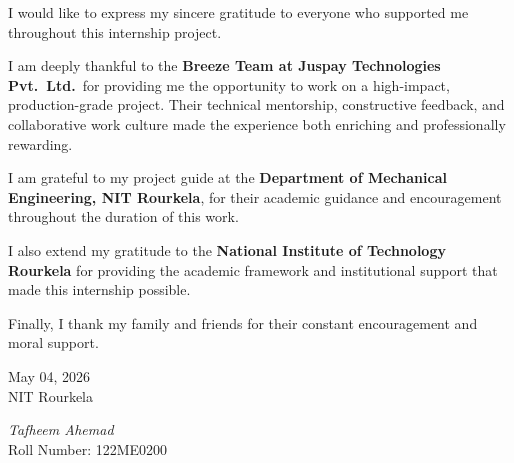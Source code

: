 \thispagestyle{empty}

\noindent
I would like to express my sincere gratitude to everyone who supported me throughout this internship project.

\vspace{4mm}
\noindent
I am deeply thankful to the \textbf{Breeze Team at Juspay Technologies Pvt.\ Ltd.}\ for providing me the opportunity to work on a high-impact, production-grade project. Their technical mentorship, constructive feedback, and collaborative work culture made the experience both enriching and professionally rewarding.

\vspace{4mm}
\noindent
I am grateful to my project guide at the \textbf{Department of Mechanical Engineering, NIT Rourkela}, for their academic guidance and encouragement throughout the duration of this work.

\vspace{4mm}
\noindent
I also extend my gratitude to the \textbf{National Institute of Technology Rourkela} for providing the academic framework and institutional support that made this internship possible.

\vspace{4mm}
\noindent
Finally, I thank my family and friends for their constant encouragement and moral support.

\vspace{15mm}
\begin{minipage}{.45\linewidth}
\begin{flushleft}
May 04, 2026\\
NIT Rourkela
\end{flushleft}
\end{minipage}
\begin{minipage}{.45\linewidth}
\begin{flushright}
\textit{Tafheem Ahemad}\\
Roll Number: 122ME0200
\end{flushright}
\end{minipage}

